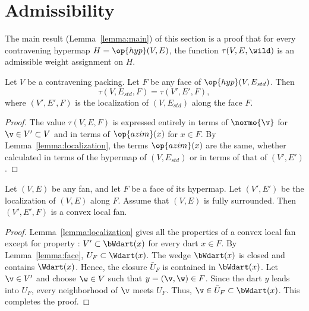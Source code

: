 \section{Admissibility}




The main result (Lemma~\ref{lemma:main}) of this section is a proof
that for every contravening hypermap $H=\op{hyp}(V,E)$, the function
$\tau(V,E,\wild)$ is an admissible weight assignment on $H$.



\begin{lemma}[]  \label{lemma:tau-local}
  Let $V$ be a contravening packing.
  Let $F$ be any face of $\op{hyp}(V,E_{std})$.  Then
\[ 
\tau(V,E_{std},F) = \tau(V',E',F),
\] 
where $(V',E',F)$ is the localization of $(V,E_{std})$ along the face $F$.
\end{lemma}

\begin{proof} The value $\tau(V,E,F)$ is expressed entirely in terms
  of $\normo{\v}$ for $\v\in V'\subset V$ and in terms of
  $\op{azim}(x)$ for $x\in F$.  By Lemma~\ref{lemma:localization},
  the terms $\op{azim}(x)$ are the same, whether calculated in terms
  of the hypermap of $(V,E_{std})$ or in terms of that of $(V',E')$.
\end{proof}


\begin{lemma}[] Let $(V,E)$ be any fan, and
  let $F$ be a face of its hypermap.  Let $(V',E')$ be the
  localization of $(V,E)$ along $F$.  Assume that $(V,E)$ is fully surrounded.
  Then $(V',E',F)$ is a convex local fan.
\end{lemma}

\begin{proof}
  Lemma~\ref{lemma:localization} gives all the properties of a convex local fan except for property : $V'\subset \bWdart(x)$ for
  every dart $x\in F$.  By Lemma~\ref{lemma:face}, $U_F \subset
  \Wdart(x)$.  The wedge $\bWdart(x)$ is closed and contains
  $\Wdart(x)$. Hence, the closure $\bar U_F$ is contained in
  $\bWdart(x)$.  Let $\v\in V'$ and choose $\w\in V$ such that
  $y=(\v,\w)\in F$.
  Since the dart $y$ leads into $U_F$, every neighborhood of $\v$
  meets $U_F$.  Thus, $\v\in \bar U_F\subset \bWdart(x)$.  This
  completes the proof.
\end{proof}








